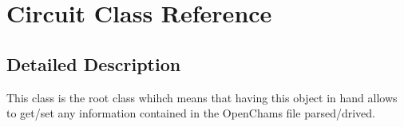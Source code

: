 \hypertarget{class_circuit}{}\section{Circuit Class Reference}
\label{class_circuit}


\subsection{Detailed Description}
This class is the root class whihch means that having this object in hand allows to get/set any information contained in the Open\+Chams file parsed/drived. 